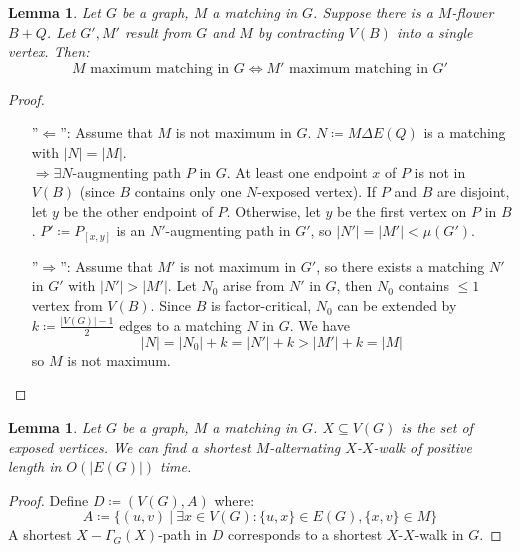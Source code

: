 \documentclass[11pt, a4paper]{article}
\newcommand{\abs}[1]{\left\lvert#1\right\rvert}
\newcommand{\set}[1]{\{#1\}}
\newtheorem{lemma}[theorem]{Lemma}
\theoremstyle{remark}
\theoremstyle{definition}
\begin{document}
\begin{lemma}
	Let $G$ be a graph, $M$ a matching in $G$. Suppose there is a $M$-flower
	$B+Q$. Let $G',M'$ result from $G$ and $M$ by contracting $V(B)$ into
	a single vertex. Then:
	\[
		M\text{ maximum matching in $G$} \Leftrightarrow
		M'\text{ maximum matching in $G'$}
	\]
\end{lemma}
\begin{proof}\
	\begin{enumerate}
		\item[''$\Leftarrow$'':]
		Assume that $M$ is not maximum in $G$. $N\coloneqq M\Delta E(Q)$
		is a matching with $\abs{N}=\abs{M}$. \\
		$\Rightarrow \exists N$-augmenting path $P$ in $G$. At least one endpoint
		$x$ of $P$ is not in $V(B)$ (since $B$ contains only one $N$-exposed
		vertex). If $P$ and $B$ are disjoint, let $y$ be the other
		endpoint of $P$. Otherwise, let $y$ be the first vertex on $P$ in $B$.
		$P'\coloneqq P_{[x,y]}$ is an $N'$-augmenting path in $G'$, so
		$\abs{N'}=\abs{M'}<\mu(G')$.

		\item[''$\Rightarrow$'':]
		Assume that $M'$ is not maximum in $G'$, so there exists a matching $N'$
		in $G'$ with $\abs{N'}>\abs{M'}$. Let $N_0$ arise from $N'$ in $G$, then
		$N_0$ contains $\leq 1$ vertex from $V(B)$. Since $B$ is factor-critical,
		$N_0$ can be extended by $k\coloneqq\frac{\abs{V(G)}-1}{2}$ edges to a
		matching $N$ in $G$. We have
		\[\abs{N}=\abs{N_0}+k=\abs{N'}+k>\abs{M'}+k=\abs{M}\]
		so $M$ is not maximum.
	\end{enumerate}
\end{proof}

\begin{lemma}
	Let $G$ be a graph, $M$ a matching in $G$. $X\subseteq V(G)$ is the set
	of exposed vertices. We can find a shortest $M$-alternating $X$-$X$-walk
	of positive length in $O(\abs{E(G)})$ time.
\end{lemma}
\begin{proof}
	Define $D\coloneqq (V(G), A)$ where:
	\[
		A\coloneqq\set{(u,v)\ |\ \exists
			x\in V(G): \set{u,x}\in E(G), \set{x,v}\in M}
	\]
	A shortest $X-\Gamma_G(X)$-path in $D$ corresponds to a shortest
	$X$-$X$-walk in $G$.
\end{proof}
\end{document}
